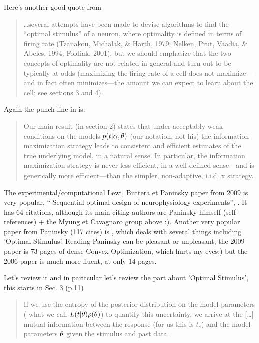 \documentclass{article}
\begin{document}
Here's another good quote from 
\begin{quote}
\ldots several attempts have been made to devise algorithms
to find the “optimal stimulus” of a neuron, where optimality is
defined in terms of firing rate (Tzanakou, Michalak, & Harth, 1979; Nelken,
Prut, Vaadia, & Abeles, 1994; Foldiak, 2001), but we should emphasize that
the two concepts of optimality are not related in general and turn out to be
typically at odds (maximizing the firing rate of a cell does not maximize—
and in fact often minimizes—the amount we can expect to learn about the
cell; see sections 3 and 4).
\end{quote}
Again the punch line in \cite{Paninski2005} is:
\begin{quote}
Our main result (in section 2) states that under
acceptably weak conditions on the models $p(t| {\alpha}, {\theta})$ (our notation, not
his) the information maximization strategy leads to consistent and
efficient estimates of the true underlying model, in a natural sense. 
In particular, the information maximization
strategy is never less efficient, in a well-defined sense—and
is generically more efficient—than the simpler, non-adaptive, i.i.d. x strategy.
\end{quote}



The experimental/computational Lewi, Buttera et Paninsky paper from 2009 is
very popular, `` Sequential
optimal design of neurophysiology experiments'', \cite{Lewi2009}. It has 64
citations, although its main citing authors are Paninsky himself
(self-references) + the Myung et Cavagnaro group above :). Another very popular
paper from Paninsky (117 cites) is \cite{Paninski2006a}, which deals with
several things including 'Optimal Stimulus'. Reading Paninsky can be pleasant or
unpleasant, the 2009 \cite{Lewi2009}paper is 73 pages of dense Convex
Optimization, which hurts my eyes:) but the 2006 paper is much more fluent, at
only 14 pages. 

Let's review it and in paritcular let's review the part about 'Optimal
Stimulus', this starts in Sec. 3 (p.11)

\begin{quote}
If we use the entropy of the posterior
distribution on the model parameters ( what we call $L(t|{\theta})
\rho({\theta})$) to quantify this uncertainty, we arrive at the [\ldots] 
mutual information between the response (for us this is $t_s$) and the model
parameters ${\theta}$ given the stimulus and past data.  
\end{quote}
\end{document}
